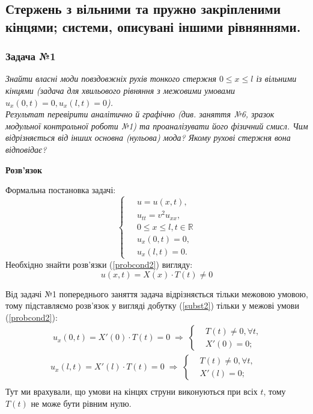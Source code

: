 \documentclass[a4paper, 14pt]{extreport}
\begin{document}
\subsection{Стержень з вільними та пружно закріпленими кінцями; системи, описувані іншими рівняннями.}

\subsubsection{Задача №1}

\textit{Знайти власні моди повздовжніх рухів тонкого стержня $0 \leq x \leq l$ із вільними кінцями  (задача для хвильового рівняння з межовими умовами $u_x(0,t) = 0, u_x(l,t) = 0$).\\
Результат перевірити аналітично й графічно (див. заняття №6, зразок модульної контрольної роботи №1) та проаналізувати його фізичний смисл. Чим відрізняється від інших основна (нульова) мода? Якому рухові стержня вона відповідає?}

\begin{center}
    \large{\textbf{Розв'язок}}
\end{center}

\noindent Формальна постановка задачі:
\begin{equation} \label{probcond2}
    \left\{ \begin{aligned} %
            \;&u = u(x,t), \\
            &u_{tt} = v^2 u_{xx}, \\
            &0 \leq x \leq l, t \in \mathbb{R} \\
            &u_x(0,t) = 0, \\
            &u_x(l,t) = 0. 
    \end{aligned} \right.
\end{equation}
Необхідно знайти розв'язки (\ref{probcond2}) вигляду:
\begin{equation} \label{subst2}
    u(x,t) = X(x) \cdot T(t) \neq 0 
\end{equation}

Від задачі №1 попереднього заняття задача відрізняється тільки межовою умовою, тому підставляємо розв'язок у вигляді добутку (\ref{subst2}) тільки у межові умови (\ref{probcond2}):
\begin{equation*}
    \begin{aligned}
        \;u_x(0,t) = X'(0) \cdot T(t) = 0
        \;\Rightarrow\;
        \left\{ \begin{aligned}
            &T(t) \neq 0, \forall t, \\  &X'(0) = 0; 
        \end{aligned} \right.\\
        u_x(l,t) = X'(l) \cdot T(t) = 0
        \;\Rightarrow\;
        \left\{ \begin{aligned}
            &T(t) \neq 0, \forall t, \\  &X'(l) = 0; 
        \end{aligned} \right.\\
    \end{aligned}
\end{equation*}
Тут ми врахували, що умови на кінцях струни виконуються при всіх $t$, тому $T(t)$ не може бути рівним нулю.\\
\end{document}

